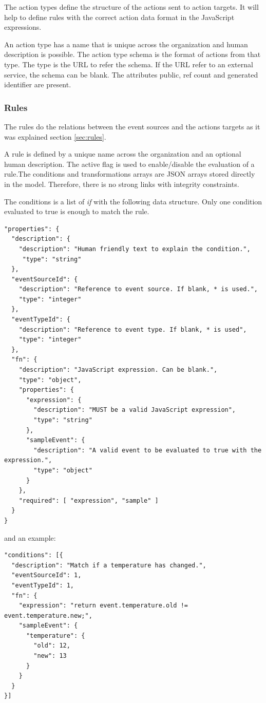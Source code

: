 The action types define the structure of the actions sent to action targets. It will help to define rules with the correct action data format in the JavaScript expressions.

An action type has a name that is unique across the organization and human description is possible. The action type schema is the format of actions from that type. The type is the URL to refer the schema. If the URL refer to an external service, the schema can be blank. The attributes public, ref count and generated identifier are present.

\subsubsection{Rules}

The rules do the relations between the event sources and the actions targets as it was explained section \ref{sec:rules}.

A rule is defined by a unique name across the organization and an optional human description. The active flag is used to enable/disable the evaluation of a rule.The conditions and transformations arrays are JSON arrays stored directly in the model. Therefore, there is no strong links with integrity constraints. 

The conditions is a list of \emph{if} with the following data structure. Only one condition evaluated to true is enough to match the rule.

\begin{lstlisting}
"properties": {
  "description": {
    "description": "Human friendly text to explain the condition.",
     "type": "string"
  },
  "eventSourceId": {
    "description": "Reference to event source. If blank, * is used.",
    "type": "integer"
  },
  "eventTypeId": {
    "description": "Reference to event type. If blank, * is used",
    "type": "integer"
  },
  "fn": {
    "description": "JavaScript expression. Can be blank.",
    "type": "object",
    "properties": {
      "expression": {
        "description": "MUST be a valid JavaScript expression",
        "type": "string"
      },
      "sampleEvent": {
        "description": "A valid event to be evaluated to true with the expression.",
        "type": "object"
      }
    },
    "required": [ "expression", "sample" ]
  }
}
\end{lstlisting}

and an example:

\begin{lstlisting}
"conditions": [{
  "description": "Match if a temperature has changed.",
  "eventSourceId": 1,
  "eventTypeId": 1,
  "fn": {
    "expression": "return event.temperature.old != event.temperature.new;",
    "sampleEvent": {
      "temperature": {
        "old": 12,
        "new": 13
      }
    }
  }
}]
\end{lstlisting}

